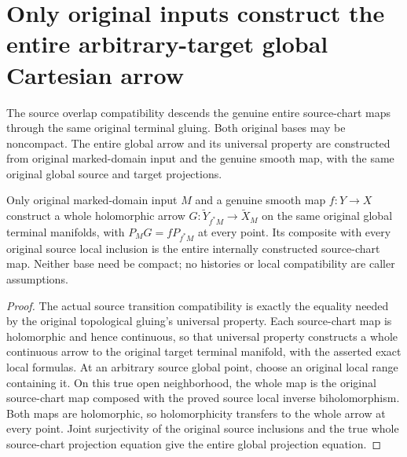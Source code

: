 \section{Only original inputs construct the entire arbitrary-target global Cartesian arrow}

The source overlap compatibility descends the genuine entire source-chart
maps through the same original terminal gluing. Both original bases may
be noncompact. The entire global arrow and its universal property are
constructed from original marked-domain input and the genuine smooth map,
with the same original global source and target projections.

\begin{theorem}
\label{hir:original-arbitrary-target-global-holomorphic-smooth-comparison}
\leanok
{}
Only original marked-domain input $M$ and a genuine smooth map $f:Y\to X$
construct a whole holomorphic arrow $G:\widetilde Y_{f^*M}\to\widetilde X_M$
on the same original global terminal manifolds, with
$P_MG=fP_{f^*M}$ at every point. Its composite with every original source
local inclusion is the entire internally constructed source-chart map.
Neither base need be compact; no histories or local compatibility are
caller assumptions.
\end{theorem}
\begin{proof}
The actual source transition compatibility is exactly the equality needed
by the original topological gluing's universal property. Each source-chart
map is holomorphic and hence continuous, so that universal property
constructs a whole continuous arrow to the original target terminal
manifold, with the asserted exact local formulas. At an arbitrary source
global point, choose an original local range containing it. On this true
open neighborhood, the whole map is the original source-chart map composed
with the proved source local inverse biholomorphism. Both maps are
holomorphic, so holomorphicity transfers to the whole arrow at every point.
Joint surjectivity of the original source inclusions and the true whole
source-chart projection equation give the entire global projection equation.
\end{proof}

